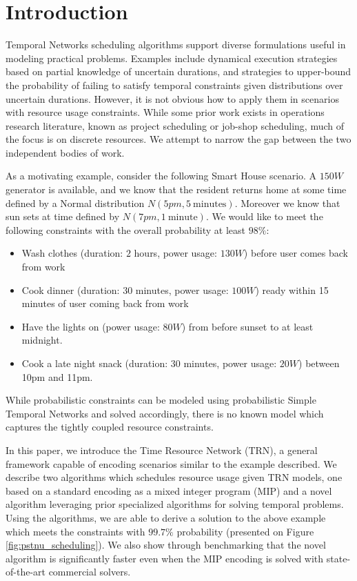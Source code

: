 \section{Introduction}
Temporal Networks scheduling algorithms support diverse formulations useful in modeling practical problems. Examples include dynamical execution strategies based on partial knowledge of uncertain durations, and strategies to upper-bound the probability of failing to satisfy temporal constraints given distributions over uncertain durations. However, it is not obvious how to apply them in scenarios with resource usage constraints. While some prior work exists in operations research literature, known as project scheduling or job-shop scheduling, much of the focus is on discrete resources. We attempt to narrow the gap between the two independent bodies of work.

As a motivating example, consider the following Smart House scenario. A $150W$ generator is available, and we know that the resident returns home at some time defined by a Normal distribution $N(5pm, 5\ \text{minutes})$. Moreover we know that sun sets at time defined by $N(7pm, 1\ \text{minute})$. We would like to meet the following constraints with the overall probability at least $98\%$:
\small{
  \begin{itemize}
  \setlength\itemsep{0.00em}

  \item Wash clothes (duration: $2$ hours, power usage: $130W$) before user comes back from work
  \item Cook dinner (duration: $30$ minutes, power usage: $100W$) ready within 15 minutes of user coming back from work
  \item Have the lights on (power usage: $80W$) from before sunset to at least midnight.
  \item Cook a late night snack (duration: $30$ minutes, power usage: $20W$) between 10pm and 11pm.
  \end{itemize}
}
While probabilistic constraints can be  modeled using probabilistic Simple Temporal Networks \cite{Fang2014} and solved accordingly, there is no known model which captures the tightly coupled resource constraints.

In this paper, we introduce the Time Resource Network (TRN), a general framework capable of encoding scenarios similar to the example described. We describe two algorithms which schedules resource usage given TRN models, one based on a standard encoding as a mixed integer program (MIP) and a novel algorithm leveraging prior specialized algorithms for solving temporal problems. Using the algorithms, we are able to derive a solution to the above example which meets the constraints with $99.7\%$ probability (presented on Figure \ref{fig:pstnu_scheduling}). We also show through benchmarking that the novel algorithm is significantly faster even when the MIP encoding is solved with state-of-the-art commercial solvers.


